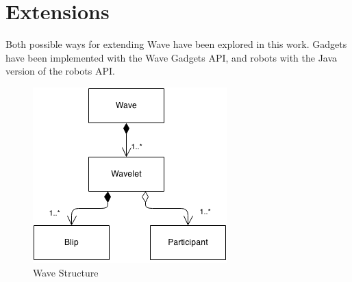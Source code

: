 \newpage
\section{Extensions}

Both possible ways for extending Wave have been explored in this work. Gadgets have been implemented with the Wave Gadgets API, and robots with the Java version of the robots API.

\begin{figure}[h]
  \center
    \includegraphics[keepaspectratio, scale=0.75]{Media/Diagrams/Wave/Structure.png}
  \caption{Wave Structure}
  \label{fig:wave_structure}
\end{figure}

